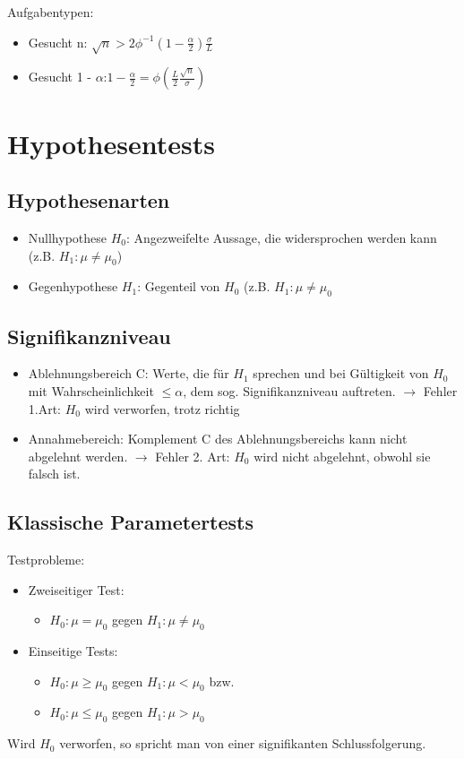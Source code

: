 \documentclass[10pt,landscape,a4paper]{article}
\begin{document}
\begin{multicols}{3}
Aufgabentypen:
\begin{itemize}
	\setlength\itemsep{-0.2em}
	\item Gesucht n: $\sqrt{n} > 2 \phi^{-1} (1 - \frac{\alpha}{2}) \frac{\sigma}{L}$
	\item Gesucht 1 - $\alpha$:$ 1 - \frac{\alpha}{2} = \phi (\frac{L}{2} \frac{\sqrt{n}}{\sigma})$
\end{itemize}


\section{Hypothesentests}
\subsection{Hypothesenarten}
\begin{itemize}
	\setlength\itemsep{-0.2em}
	\item Nullhypothese $H_0$: Angezweifelte Aussage, die widersprochen werden kann (z.B. $H_1 : \mu \neq \mu_0$)
	\item Gegenhypothese $H_1$: Gegenteil von $H_0$ (z.B. $H_1 : \mu \neq \mu_0$
\end{itemize}

\subsection{Signifikanzniveau}
\begin{itemize}
	\setlength\itemsep{-0.2em}
	\item Ablehnungsbereich C: Werte, die für $H_1$ sprechen und bei Gültigkeit von $H_0$ mit Wahrscheinlichkeit $\leq \alpha$, dem sog. Signifikanzniveau auftreten. $\rightarrow$ Fehler 1.Art: $H_0$ wird verworfen, trotz richtig
	\item Annahmebereich: Komplement $\text{\={C}}$ des Ablehnungsbereichs kann nicht abgelehnt werden. $\rightarrow$ Fehler 2. Art: $H_0$ wird nicht abgelehnt, obwohl sie falsch ist.
\end{itemize}

\subsection{Klassische Parametertests}
Testprobleme:
\begin{itemize}
	\setlength\itemsep{-0.2em}
	\item Zweiseitiger Test:
	\begin{itemize}
		\setlength\itemsep{-0.2em}
		\item $H_0 : \mu = \mu_0$ gegen $H_1 : \mu \neq \mu_0$
	\end{itemize}
	\item Einseitige Tests:
	\begin{itemize}
		\setlength\itemsep{-0.2em}
		\item $H_0 : \mu \geq \mu_0$ gegen $H_1 : \mu < \mu_0$ bzw.
		\item $H_0 : \mu \leq \mu_0$ gegen $H_1 : \mu > \mu_0$
	\end{itemize}
\end{itemize}
Wird $H_0$ verworfen, so spricht man von einer signifikanten Schlussfolgerung.


\end{multicols}
\end{document}
